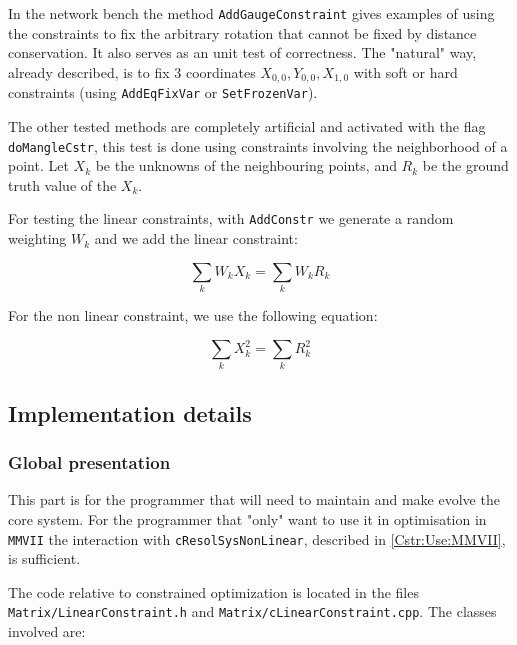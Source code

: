 In the network bench the method {\tt AddGaugeConstraint} gives examples of using 
the constraints to fix the arbitrary rotation that cannot be fixed by distance conservation.
It also serves as an unit test of correctness.  The "natural" way, already described, is to fix
$3$ coordinates $X_{0,0},Y_{0,0},X_{1,0}$ with soft or hard constraints (using  {\tt AddEqFixVar} or  {\tt SetFrozenVar}).

The other tested methods are completely artificial and activated with the flag {\tt doMangleCstr},
this test is done using constraints involving the neighborhood of a point.
Let $X_k$ be the unknowns of the neighbouring points, and $R_k$  be the 
ground truth value of the $X_k$.

For testing the linear constraints, with {\tt AddConstr} we generate a random weighting $W_k$
and we add the linear constraint:

\begin{equation}
    \sum_k W_k  X_k = \sum_k  W_k  R_k  
\end{equation}

For the non linear constraint, we use the following equation:

\begin{equation}
    \sum_k  X_k^2 = \sum_k   R_k^2
\end{equation}


\subsection{Implementation details}


\subsubsection{Global presentation }

This part is for the programmer that will need to maintain and make evolve the core system.
For the programmer that "only" want to use it in optimisation in {\tt MMVII}
the interaction with {\tt cResolSysNonLinear}, described 
in \ref{Cstr:Use:MMVII}, is sufficient.

The code relative to constrained optimization is located in the files {\tt Matrix/LinearConstraint.h}
and  {\tt Matrix/cLinearConstraint.cpp}. The classes involved are:

